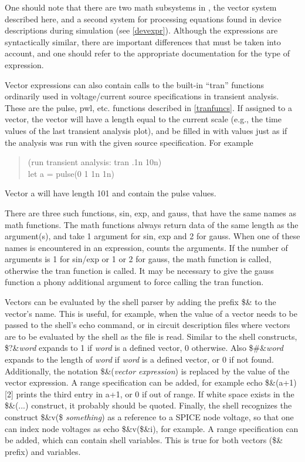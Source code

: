 One should note that there are two math subsystems in {\WRspice}, the
vector system described here, and a second system for processing
equations found in device descriptions during simulation (see
\ref{devexpr}).  Although the expressions are syntactically similar,
there are important differences that must be taken into account, and
one should refer to the appropriate documentation for the type of
expression.

Vector expressions can also contain calls to the built-in ``tran''
functions ordinarily used in voltage/current source specifications in
transient analysis.  These are the {\vt pulse}, {\vt pwl}, etc. 
functions described in \ref{tranfuncs}.  If assigned to a vector, the
vector will have a length equal to the current scale (e.g., the time
values of the last transient analysis plot), and be filled in with
values just as if the analysis was run with the given source
specification.  For example
\begin{quote}
    (run transient analysis: tran .1n 10n)\\
    {\vt let a = pulse(0 1 1n 1n)}
\end{quote}
Vector {\vt a} will have length 101 and contain the pulse values.

There are three such functions, {\vt sin}, {\vt exp}, and {\vt
gauss}, that have the same names as math functions.  The math
functions always return data of the same length as the argument(s),
and take 1 argument for {\vt sin}, {\vt exp} and 2 for {\vt gauss}. 
When one of these names is encountered in an expression, {\WRspice}
counts the arguments.  If the number of arguments is 1 for {\vt
sin}/{\vt exp} or 1 or 2 for {\vt gauss}, the math function is called,
otherwise the tran function is called.  It may be necessary to give
the {\vt gauss} function a phony additional argument to force calling
the tran function.

Vectors can be evaluated by the shell parser by adding the prefix {\vt
\$\&} to the vector's name.  This is useful, for example, when the
value of a vector needs to be passed to the shell's {\cb echo}
command, or in circuit description files where vectors are to be
evaluated by the shell as the file is read.  Similar to the shell
constructs, {\vt \$?\&{\it word\/}} expands to 1 if {\it word\/} is a
defined vector, 0 otherwise.  Also {\vt \$\#\&{\it word\/}} expands to
the length of {\it word\/} if {\it word\/} is a defined vector, or 0
if not found.  Additionally, the notation {\vt \$\&({\it vector
expression\/})} is replaced by the value of the vector expression.  A
range specification can be added, for example {\vt echo \$\&(a+1)[2]}
prints the third entry in {\vt a+1}, or 0 if out of range.  If white
space exists in the {\vt \$\&(...)} construct, it probably should be
quoted.  Finally, the shell recognizes the construct {\vt \$\&v(\${\it
something\/})} as a reference to a SPICE node voltage, so that one can
index node voltages as {\vt echo \$\&v(\$\&i)}, for example.  A range
specification can be added, which can contain shell variables.  This
is true for both vectors ({\vt \$\&} prefix) and variables.

